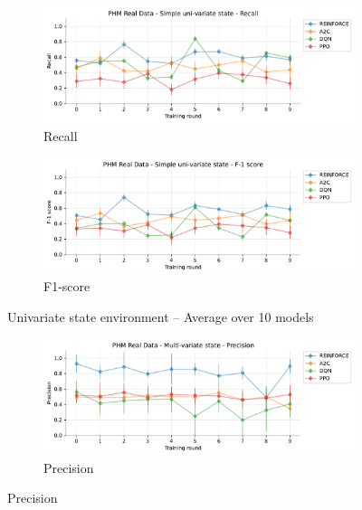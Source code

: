 \documentclass[a4paper, 12pt]{article}
\begin{document}
\begin{appendices}
\begin{figure}[h]
	\begin{subfigure}{\textwidth}
		\centering
		\includegraphics[width=\linewidth]{Singevariable_Rc.pdf}  
		\caption{Recall}
		\label{fig:tr-ss-rc}
	\end{subfigure} \par\smallskip
	
	\begin{subfigure}{\textwidth}
		\centering
		\includegraphics[width=\linewidth]{Singevariable_F1.pdf}  
		\caption{F1-score}
		\label{fig:tr-ss-f1}
	\end{subfigure} \par\smallskip
	\caption{Univariate state environment -- Average over 10 models}
	\label{fig:tr-ss-env}
\end{figure}

\begin{figure}[h]
	\begin{subfigure}{\textwidth}
		\centering
		\includegraphics[width=\linewidth]{Multivariate_Pr.pdf}  
		\caption{Precision}
		\label{fig:tr-ms-pr}
	\end{subfigure} \par\smallskip
	

\end{figure}
\end{appendices}
\end{document}
